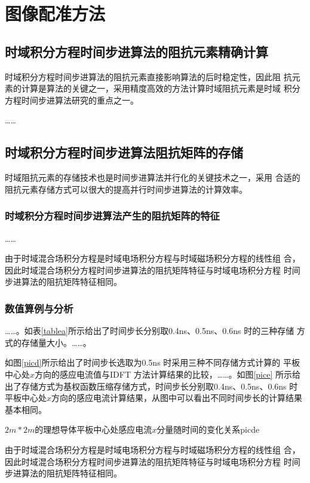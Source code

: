
\chapter{图像配准方法}
\section{时域积分方程时间步进算法的阻抗元素精确计算}
时域积分方程时间步进算法的阻抗元素直接影响算法的后时稳定性，因此阻
抗元素的计算是算法的关键之一，采用精度高效的方法计算时域阻抗元素是时域
积分方程时间步进算法研究的重点之一。

……
\section{时域积分方程时间步进算法阻抗矩阵的存储}
时域阻抗元素的存储技术也是时间步进算法并行化的关键技术之一，采用
合适的阻抗元素存储方式可以很大的提高并行时间步进算法的计算效率。
\subsection{时域积分方程时间步进算法产生的阻抗矩阵的特征}
……

由于时域混合场积分方程是时域电场积分方程与时域磁场积分方程的线性组
合，因此时域混合场积分方程时间步进算法的阻抗矩阵特征与时域电场积分方程
时间步进算法的阻抗矩阵特征相同。
\subsection{数值算例与分析}
……。如表\ref{tablea}所示给出了时间步长分别取0.4ns、0.5ns、0.6ns 时的三种存储
方式的存储量大小。……。

如图\ref{picd}所示给出了时间步长选取为0.5ns 时采用三种不同存储方式计算的
平板中心处$x$方向的感应电流值与IDFT 方法计算结果的比较，……。如图\ref{pice}
所示给出了存储方式为基权函数压缩存储方式，时间步长分别取0.4ns、0.5ns、0.6ns
时平板中心处$x$方向的感应电流计算结果，从图中可以看出不同时间步长的计算结果基本相同。

\begin{pics}[h]{$2m*2m$的理想导体平板中心处感应电流$x$分量随时间的变化关系}{picde}
\end{pics}
%
由于时域混合场积分方程是时域电场积分方程与时域磁场积分方程的线性组
合，因此时域混合场积分方程时间步进算法的阻抗矩阵特征与时域电场积分方程
时间步进算法的阻抗矩阵特征相同。
